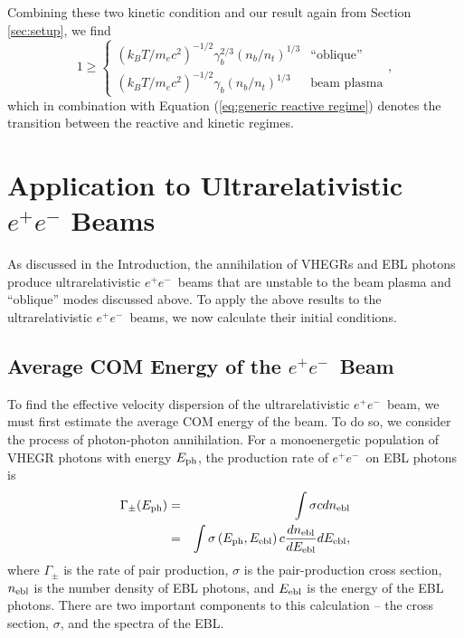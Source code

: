 \documentclass[usenatbib,iop,apj]{emulateapj}
\newcommand{\epm}{\ensuremath{e^+e^-}}
\begin{document}
Combining these two kinetic condition and our result again from Section \ref{sec:setup}, we find  
\begin{equation}\label{eq:generic kinetic regime}
1 \ge \left\{
\begin{array}{cl}
({k_BT}/{m_ec^2})^{-1/2}\gamma_b^{2/3}\left({n_b}/{n_t}\right)^{1/3} & \textrm{``oblique''} \\
({k_BT}/{m_ec^2})^{-1/2}\gamma_b\left({n_b}/{n_t}\right)^{1/3} & \textrm{beam plasma} 
\end{array}
\right.,
\end{equation}
which in combination with Equation (\ref{eq:generic reactive regime}) denotes the transition between the reactive and kinetic regimes.

\section{Application to Ultrarelativistic $\epm$ Beams}\label{sec:application}

As discussed in the Introduction, the annihilation of VHEGRs and EBL photons produce ultrarelativistic \epm\ beams that are unstable to the beam plasma and ``oblique'' modes discussed above.  To apply the above results to the ultrarelativistic \epm\ beams, we now calculate their initial conditions.

\subsection{Average COM Energy of the \epm\ Beam}\label{sec:temperature}

To find the effective velocity dispersion of the ultrarelativistic \epm\ beam, we must first estimate the average COM energy of the beam.  To do so, we consider the process of photon-photon annihilation.  For a monoenergetic population of VHEGR photons with energy $E_{\rm ph}$, the production rate of \epm\ on EBL photons is
\begin{eqnarray}
\Gamma_{\pm}(E_{\rm ph}) &=& \int \sigma c dn_{\rm ebl} \nonumber \\
&=& \int \sigma\left(E_{\rm ph}, E_{\rm ebl}\right) c \frac{dn_{\rm ebl}}{dE_{\rm ebl}} dE_{\rm ebl},
\end{eqnarray}
where $\Gamma_{\pm}$ is the rate of pair production, $\sigma$ is the pair-production cross section, $n_{\rm ebl}$ is the number density of EBL photons, and $E_{\rm ebl}$ is the energy of the EBL photons.  There are two important components to this calculation -- the cross section, $\sigma$, and the spectra of the EBL.  
\end{document}
